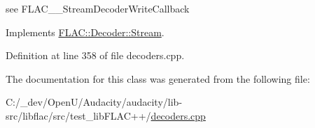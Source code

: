 see F\+L\+A\+C\+\_\+\+\_\+\+Stream\+Decoder\+Write\+Callback 



Implements \hyperlink{class_f_l_a_c_1_1_decoder_1_1_stream_af5a61e9ff720cca3eb38d1f2790f00fb}{F\+L\+A\+C\+::\+Decoder\+::\+Stream}.



Definition at line 358 of file decoders.\+cpp.



The documentation for this class was generated from the following file\+:\begin{DoxyCompactItemize}
\item 
C\+:/\+\_\+dev/\+Open\+U/\+Audacity/audacity/lib-\/src/libflac/src/test\+\_\+lib\+F\+L\+A\+C++/\hyperlink{decoders_8cpp}{decoders.\+cpp}\end{DoxyCompactItemize}
